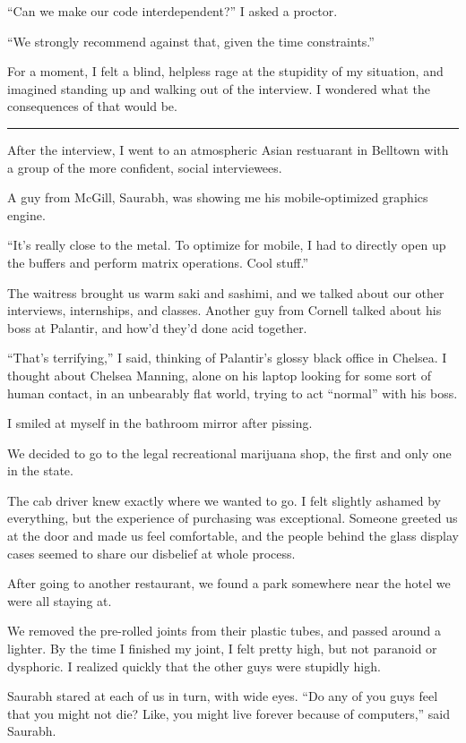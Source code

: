 ``Can we make our code interdependent?'' I asked a proctor.

``We strongly recommend against that, given the time constraints.''

For a moment, I felt a blind, helpless rage at the stupidity of my situation,
and imagined standing up and walking out of the interview.  I wondered what the
consequences of that would be.  

\plainfancybreak{12pt}{2}{* * *}

After the interview, I went to an atmospheric Asian restuarant in Belltown with
a group of the more confident, social interviewees.  

A guy from McGill, Saurabh, was showing me his mobile-optimized graphics engine.

``It's really close to the metal.  To optimize for mobile, I had to directly
open up the buffers and perform matrix operations.  Cool stuff.''

The waitress brought us warm saki and sashimi, and we talked about our other
interviews, internships, and classes.  Another guy from Cornell talked about his
boss at Palantir, and how'd they'd done acid together.

``That's terrifying,'' I said, thinking of Palantir's glossy black office in
Chelsea.  I thought about Chelsea Manning, alone on his laptop looking for some
sort of human contact, in an unbearably flat world, trying to act ``normal''
with his boss.

I smiled at myself in the bathroom mirror after pissing.

We decided to go to the legal recreational marijuana shop, the first and only
one in the state. 

The cab driver knew exactly where we wanted to go.  I felt slightly ashamed by
everything, but the experience of purchasing was exceptional.  Someone greeted
us at the door and made us feel comfortable, and the people behind the glass
display cases seemed to share our disbelief at whole process.

After going to another restaurant, we found a park somewhere near the hotel we
were all staying at.

We removed the pre-rolled joints from their plastic tubes, and passed around a
lighter.  By the time I finished my joint, I felt pretty high, but not paranoid
or dysphoric.  I realized quickly that the other guys were stupidly high.

Saurabh stared at each of us in turn, with wide eyes.  ``Do any of you guys feel
that you might not die?  Like, you might live forever because of computers,''
said Saurabh.  

